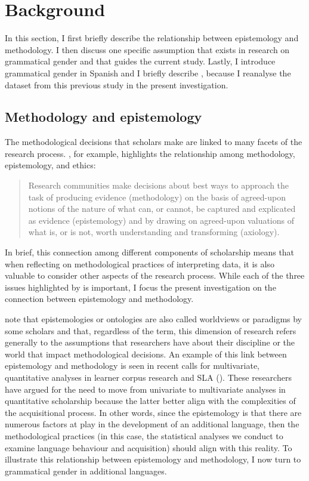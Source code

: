 \documentclass[output=paper,colorlinks,citecolor=brown,modfonts,nonflat]{../langscibook}
\begin{document}
\section{Background}\label{sec:gudmestad:2}

In this section, I first briefly describe the relationship between epistemology and methodology. I then discuss one specific assumption that exists in research on grammatical gender and that guides the current study. Lastly, I introduce grammatical gender in Spanish and I briefly describe \citet{GudmestadEtAl2019}, because I reanalyse the dataset from this previous study in the present investigation.

\subsection{Methodology and epistemology}\label{sec:gudmestad:2.1}

The methodological decisions that scholars make are linked to many facets of the research process. \citet{Ortega2005}, for example, highlights the relationship among methodology, epistemology, and ethics:

\begin{quote}
Research communities make decisions about best ways to approach the task of producing evidence (methodology) on the basis of agreed-upon notions of the nature of what can, or cannot, be captured and explicated as evidence (epistemology) and by drawing on agreed-upon valuations of what is, or is not, worth understanding and transforming (axiology). \citep[317]{Ortega2005}
\end{quote}


In brief, this connection among different components of scholarship means that when reflecting on methodological practices of interpreting data, it is also valuable to consider other aspects of the research process. While each of the three issues highlighted by \citeauthor{Ortega2005} is important, I focus the present investigation on the connection between epistemology and methodology. 



\citet[5]{CreswellCreswell2018} note that epistemologies or ontologies are also called worldviews or paradigms by some scholars and that, regardless of the term, this dimension of research refers generally to the assumptions that researchers have about their discipline or the world that impact methodological decisions. An example of this link between epistemology and methodology is seen in recent calls for multivariate, quantitative analyses in learner corpus research \citep{Gries2015} and SLA (\citealt{PlonskyOswald2017}). These researchers have argued for the need to move from univariate to multivariate analyses in quantitative scholarship because the latter better align with the complexities of the acquisitional process. In other words, since the epistemology is that there are numerous factors at play in the development of an additional language, then the methodological practices (in this case, the statistical analyses we conduct to examine language behaviour and acquisition) should align with this reality. To illustrate this relationship between epistemology and methodology, I now turn to grammatical gender in additional languages. 
\end{document}
